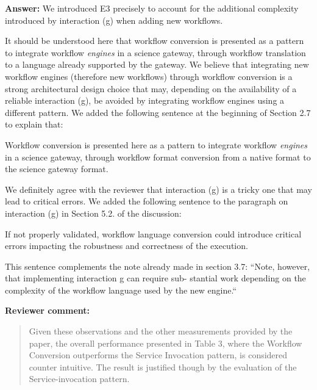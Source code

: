 \documentclass[a4]{article}
\newenvironment{review}%
{\textbf{Reviewer comment:}\begin{quote}}%
{\end{quote}}%
\newcommand{\answer}[1]{\textbf{Answer:} #1}
\newcommand{\revised}[1]{\color{blue} #1\color{black}}
\begin{document}
\answer{We introduced E3 precisely to account for the additional
  complexity introduced by interaction (g) when adding new
  workflows. 

It should be understood here that workflow conversion is
  presented as a pattern to integrate workflow \emph{engines} in a
  science gateway, through workflow translation to a language already
  supported by the gateway. We believe that integrating new workflow
  engines (therefore new workflows) through workflow conversion is a
  strong architectural design choice that may, depending on the
  availability of a reliable interaction (g), be avoided by
  integrating workflow engines using a different pattern. We added the following sentence at the beginning of Section 2.7 to explain that:

\revised{Workflow conversion is presented here as a pattern to
integrate workflow \emph{engines} in a science gateway, through
workflow format conversion from a native format to the science gateway
format.}
}

We definitely agree with the reviewer that interaction (g) is
  a tricky one that may lead to critical errors. We added the
  following sentence to the paragraph on interaction (g) in Section
  5.2. of the discussion:

\revised{If not properly validated, workflow language conversion
  could introduce critical errors impacting the robustness and
  correctness of the execution. }

This sentence complements the note already made in section 3.7:
``Note, however,
that implementing interaction g can require sub-
stantial work depending on the complexity of the
workflow language used by the new engine.``

\begin{review}
 Given these observations and the other measurements provided by the paper, the overall performance presented in Table 3, where the Workflow Conversion outperforms the Service Invocation pattern, is considered counter intuitive. The result is justified though by the evaluation of the Service-invocation pattern.
\end{review}
\end{document}
